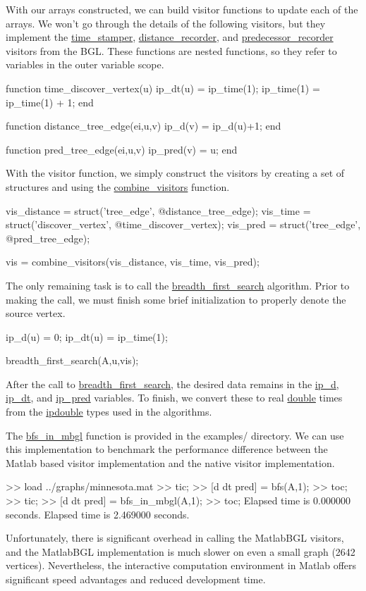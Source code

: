 \documentclass[12pt]{article}
\newcommand{\mycmd}[1]{\url{#1}}
\newcommand{\mypath}[1]{{\ttfamily \small #1}}
\begin{document}
 	With our arrays constructed, we can build visitor functions to update each of the arrays.  We won't go through the details of the following visitors, but they implement the \mycmd{time_stamper}, \mycmd{distance_recorder}, and \mycmd{predecessor_recorder} visitors from the BGL.	 These functions are nested functions, so they refer to variables in the outer variable scope.
 	\begin{mcode}
function time_discover_vertex(u)
    ip_dt(u) = ip_time(1);
    ip_time(1) = ip_time(1) + 1;
end

function distance_tree_edge(ei,u,v)
    ip_d(v) = ip_d(u)+1;
end

function pred_tree_edge(ei,u,v)
    ip_pred(v) = u;
end 	
\end{mcode}
  With the visitor function, we simply construct the visitors by creating a set of structures and using the \mycmd{combine_visitors} function.
\begin{mcode}
vis_distance = struct('tree_edge', @distance_tree_edge);
vis_time = struct('discover_vertex', @time_discover_vertex);
vis_pred = struct('tree_edge', @pred_tree_edge);

vis = combine_visitors(vis_distance, vis_time, vis_pred);
\end{mcode}
The only remaining task is to call the \mycmd{breadth_first_search} algorithm.  Prior to making the call, we must finish some brief initialization to properly denote the source vertex.
\begin{mcode}
ip_d(u) = 0;
ip_dt(u) = ip_time(1);

breadth_first_search(A,u,vis);
\end{mcode}  
After the call to \mycmd{breadth_first_search}, the desired data remains in the \mycmd{ip_d}, \mycmd{ip_dt}, and \mycmd{ip_pred} variables.  To finish, we convert these to real \mycmd{double} times from the \mycmd{ipdouble} types used in the algorithms.

 The \mycmd{bfs_in_mbgl} function is provided in the \mypath{examples/} directory.  We can use this implementation to benchmark the performance difference between the Matlab based visitor implementation and the native visitor implementation.  
	\begin{mcode}
>> load ../graphs/minnesota.mat
>> tic;
>> [d dt pred] = bfs(A,1);
>> toc;
>> tic;
>> [d dt pred] = bfs_in_mbgl(A,1);
>> toc;
Elapsed time is 0.000000 seconds.
Elapsed time is 2.469000 seconds.
\end{mcode}
Unfortunately, there is significant overhead in calling the MatlabBGL visitors, and the MatlabBGL implementation is much slower on even a small graph (2642 vertices).  Nevertheless, the interactive computation environment in Matlab offers significant speed advantages and reduced development time.
\end{document}
